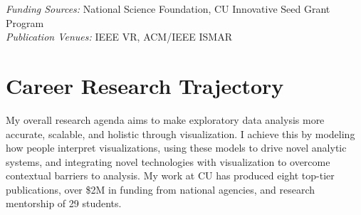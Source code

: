 \documentclass[11pt]{article}
\begin{document}


\emph{Funding Sources:} National Science Foundation, CU Innovative Seed Grant Program\\
\emph{Publication Venues:} IEEE VR, ACM/IEEE ISMAR

\section*{Career Research Trajectory}

My overall research agenda aims to 
make exploratory data analysis more accurate, scalable, and holistic through visualization. I achieve this by modeling how people interpret visualizations, using these models to drive novel analytic systems, and integrating novel technologies with visualization to overcome contextual barriers to analysis. My work at CU has produced eight top-tier publications, over \$2M in funding from national agencies, and research mentorship of 29 students. 
\end{document}
